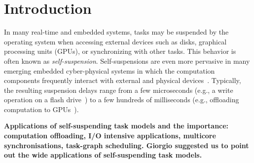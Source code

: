 \section{Introduction}

In many real-time and embedded systems, tasks may be suspended by the operating system when accessing external devices such as disks, graphical processing units (GPUs), or synchronizing with other tasks. 
This behavior is often known as \emph{self-suspension}. Self-suspensions are even more pervasive in many emerging embedded cyber-physical systems in which the computation components frequently interact with external and physical devices~\cite{Kang:rtss07,Kato_2011}. Typically, the resulting suspension delays range from a few microseconds (e.g., a write operation on a flash drive~\cite{Kang:rtss07}) to a few hundreds of milliseconds (e.g., offloading computation to GPUs~\cite{Kato_2011,Liu_2014}).


\textbf{Applications of self-suspending task models and the importance: computation offloading, I/O intensive applications, multicore synchronisations, task-graph scheduling. Giorgio suggested us to point out the wide applications of self-suspending task models.}
  
  